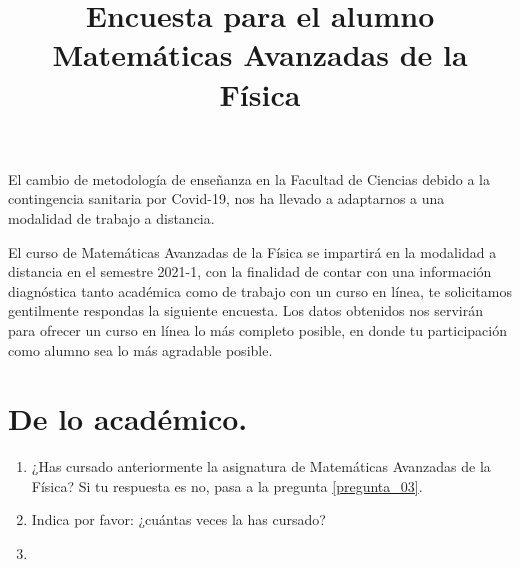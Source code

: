 
\usepackage{geometry}
\geometry{top=1.25cm, bottom=1.5cm, left=1.25cm, right=1.25cm}
\usepackage{enumerate}
\usepackage{pifont}
\renewcommand{\labelitemi}{\ding{43}}
\title{{Encuesta para el alumno} \\ {\large Matemáticas Avanzadas de la Física} \vspace{-1.5\baselineskip}}
\date{ }
\let\olditemize\itemize
\def\itemize{\olditemize\itemsep=0pt}

\renewcommand\labelenumii{\theenumi.{\arabic{enumii}}}
\maketitle
\fontsize{14}{14}\selectfont
El cambio de metodología de enseñanza en la Facultad de Ciencias debido a la contingencia sanitaria por Covid-19, nos ha llevado a adaptarnos a una modalidad de trabajo a distancia.
\par
El curso de Matemáticas Avanzadas de la Física se impartirá en la modalidad a distancia en el semestre 2021-1, con la finalidad de contar con una información diagnóstica tanto académica como de trabajo con un curso en línea, te solicitamos gentilmente respondas la siguiente encuesta. Los datos obtenidos nos servirán para ofrecer un curso en línea lo más completo posible, en donde tu participación como alumno sea lo más agradable posible.
\section*{De lo académico.}
\begin{enumerate}
\item \label{pregunta_01} ¿Has cursado anteriormente la asignatura de Matemáticas Avanzadas de la Física? Si tu respuesta es no, pasa a la pregunta \ref{pregunta_03}.
\item \label{pregunta_02} Indica por favor: ¿cuántas veces la has cursado?
\item \label{pregunta_03} 
\end{enumerate}
